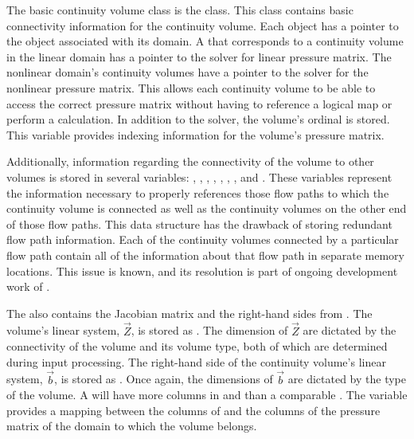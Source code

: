 The basic continuity volume class is the  class.
This class contains basic connectivity information for the continuity volume.
Each  object has a pointer to the  object associated with its domain.
A  that corresponds to a continuity volume in the linear domain has a  pointer to the solver for linear pressure matrix.
The nonlinear domain's continuity volumes have a  pointer to the solver for the nonlinear pressure matrix.
This allows each continuity volume to be able to access the correct pressure matrix without having to reference a logical map or perform a calculation.
In addition to the solver, the volume's ordinal is stored.
This variable provides indexing information for the volume's pressure matrix.

Additionally, information regarding the connectivity of the volume to other volumes is stored in several variables: , , , , , , , and .
These variables represent the information necessary to properly references those flow paths to which the continuity volume is connected as well as the continuity volumes on the other end of those flow paths.
This data structure has the drawback of storing redundant flow path information.
Each of the continuity volumes connected by a particular flow path contain all of the information about that flow path in separate memory locations.
This issue is known, and its resolution is part of ongoing development work of \cobra{}.

The  also contains the Jacobian matrix and the right-hand sides from .
The volume's linear system, $\vec{Z}$, is stored as .
The dimension of $\vec{Z}$ are dictated by the connectivity of the volume and its volume type, both of which are determined during input processing.
The right-hand side of the continuity volume's linear system, $\vec{b}$, is stored as .
Once again, the dimensions of $\vec{b}$ are dictated by the type of the volume.
A  will have more columns in  and  than a comparable .  
The variable  provides a mapping between the columns of  and the columns of the pressure matrix of the domain to which the volume belongs.

